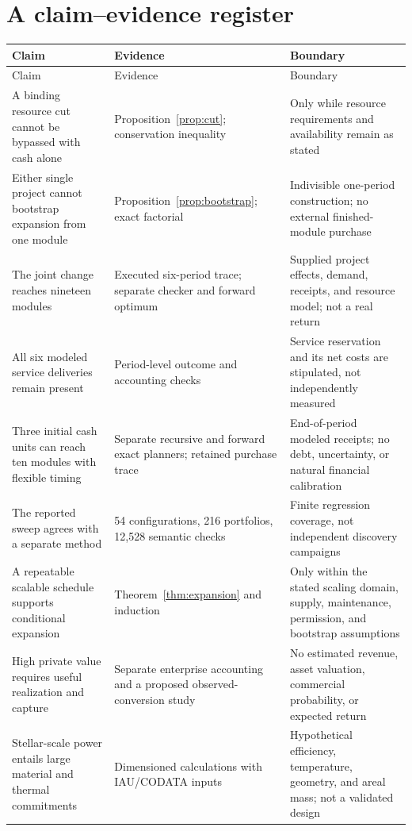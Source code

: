 \documentclass[11pt,letterpaper]{article}
\newcommand{\1}{\mathbf 1}
\theoremstyle{remark}\newtheorem{remark}{Remark}[section]
\begin{document}
\section{A claim--evidence register}\label{app:claims}
\small
\begin{longtable}{@{}P{.29\linewidth}P{.33\linewidth}P{.32\linewidth}@{}}
\toprule
Claim & Evidence & Boundary\\\midrule
\endfirsthead
\toprule Claim & Evidence & Boundary\\\midrule
\endhead
A binding resource cut cannot be bypassed with cash alone & Proposition~\ref{prop:cut}; conservation inequality & Only while resource requirements and availability remain as stated\\
Either single project cannot bootstrap expansion from one module & Proposition~\ref{prop:bootstrap}; exact factorial & Indivisible one-period construction; no external finished-module purchase\\
The joint change reaches nineteen modules & Executed six-period trace; separate checker and forward optimum & Supplied project effects, demand, receipts, and resource model; not a real return\\
All six modeled service deliveries remain present & Period-level outcome and accounting checks & Service reservation and its net costs are stipulated, not independently measured\\
Three initial cash units can reach ten modules with flexible timing & Separate recursive and forward exact planners; retained purchase trace & End-of-period modeled receipts; no debt, uncertainty, or natural financial calibration\\
The reported sweep agrees with a separate method & 54 configurations, 216 portfolios, 12,528 semantic checks & Finite regression coverage, not independent discovery campaigns\\
A repeatable scalable schedule supports conditional expansion & Theorem~\ref{thm:expansion} and induction & Only within the stated scaling domain, supply, maintenance, permission, and bootstrap assumptions\\
High private value requires useful realization and capture & Separate enterprise accounting and a proposed observed-conversion study & No estimated revenue, asset valuation, commercial probability, or expected return\\
Stellar-scale power entails large material and thermal commitments & Dimensioned calculations with IAU/CODATA inputs & Hypothetical efficiency, temperature, geometry, and areal mass; not a validated design\\

\end{longtable}
\end{document}
